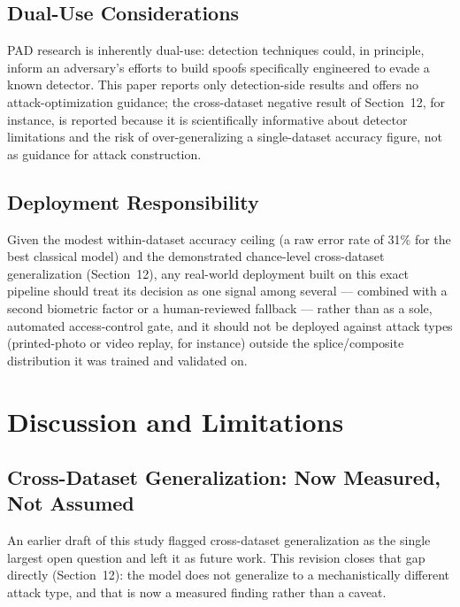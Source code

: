 \documentclass[11pt]{article}
\begin{document}
\subsection{Dual-Use Considerations}

PAD research is inherently dual-use: detection techniques could, in principle, inform an adversary's efforts to build spoofs specifically engineered to evade a known detector. This paper reports only detection-side results and offers no attack-optimization guidance; the cross-dataset negative result of Section~12, for instance, is reported because it is scientifically informative about detector limitations and the risk of over-generalizing a single-dataset accuracy figure, not as guidance for attack construction.

\subsection{Deployment Responsibility}

Given the modest within-dataset accuracy ceiling (a raw error rate of 31\% for the best classical model) and the demonstrated chance-level cross-dataset generalization (Section~12), any real-world deployment built on this exact pipeline should treat its decision as one signal among several --- combined with a second biometric factor or a human-reviewed fallback --- rather than as a sole, automated access-control gate, and it should not be deployed against attack types (printed-photo or video replay, for instance) outside the splice/composite distribution it was trained and validated on.

\section{Discussion and Limitations}

\subsection{Cross-Dataset Generalization: Now Measured, Not Assumed}

An earlier draft of this study flagged cross-dataset generalization as the single largest open question and left it as future work. This revision closes that gap directly (Section~12): the model does not generalize to a mechanistically different attack type, and that is now a measured finding rather than a caveat.
\end{document}
